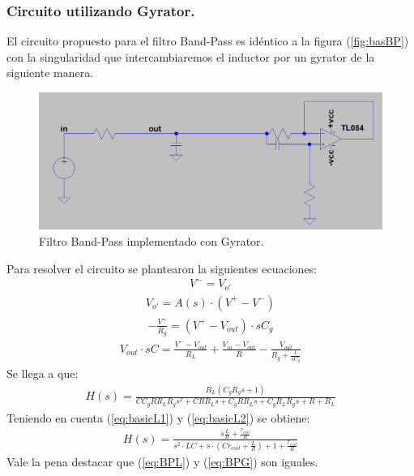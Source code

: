 \documentclass[a4paper]{article}
\begin{document}
\subsubsection{Circuito utilizando Gyrator.}
El circuito propuesto para el filtro Band-Pass es idéntico a la figura (\ref{fig:basBP}) con la singularidad que intercambiaremos el inductor por un gyrator de la siguiente manera.
\begin{figure}[H]	
	\centering
	\includegraphics[width=\textwidth]{ImagenesEj2/gyrBP.PNG}
	\caption{Filtro Band-Pass implementado con Gyrator.}
	\label{fig:gyrBP}
\end{figure}
Para resolver el circuito se plantearon la siguientes ecuaciones:
\begin{align}V^- = V_{o'}\end{align}
\begin{align}V_{o'} = A(s)\cdot (V^+-V^-)\end{align}
\begin{align} -\frac{V^+}{R_g}=(V^+-V_{out})\cdot sC_g \end{align}
\begin{align}  V_{out}\cdot sC= \frac{V^--V_{out}}{R_L}+\frac{V_{in}-V_{out}}{R}-\frac{V_{out}}{R_g+\frac{1}{sC_g}}\end{align}
Se llega a que:
\begin{align}H(s)=\frac{R_{L} \left(C_{g} R_{g} s + 1\right)}{C C_{g} R R_{L} R_{g} s^{2} + C R R_{L} s + C_{g} R R_{L} s + C_{g} R_{L} R_{g} s + R + R_{L}}
\end{align}
Teniendo en cuenta (\ref{eq:basicL1}) y (\ref{eq:basicL2}) se obtiene:
\begin{align}H(s)=\frac{s\frac{L}{R}+\frac{r_{coil}}{R}}{s^2\cdot LC +s \cdot (Cr_{coil}+\frac{L}{R})+1+\frac{r_{coil}}{R}}
\label{eq:BPG}
\end{align}
Vale la pena destacar que (\ref{eq:BPL}) y (\ref{eq:BPG}) son iguales.
\end{document}
